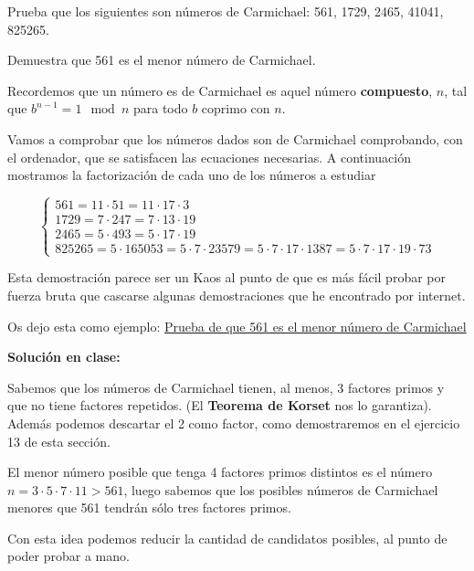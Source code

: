 

\begin{problem}[11]
\ppart Prueba que los siguientes son números de Carmichael: 561,
1729, 2465, 41041, 825265.

\ppart Demuestra que 561 es el menor número de Carmichael.

\solution


\spart
Recordemos que un número es de Carmichael es aquel número \textbf{compuesto}, $n$, tal que $b^{n-1}=1 \mod n$ para todo $b$ coprimo con $n$.

Vamos a comprobar que los números dados son de Carmichael comprobando, con el ordenador, que se satisfacen las ecuaciones necesarias. A continuación mostramos la factorización de cada uno de los números a estudiar

\[ \left\{\begin{array}{l}
561 = 11 \cdot 51 = 11 \cdot 17 \cdot 3\\
1729 = 7 \cdot 247 = 7 \cdot 13 \cdot 19\\
2465 = 5 \cdot 493 = 5 \cdot 17 \cdot 19\\
825265 = 5 \cdot 165053 = 5 \cdot 7 \cdot 23579 = 5 \cdot 7 \cdot 17 \cdot 1387 = 5 \cdot 7 \cdot 17 \cdot 19 \cdot 73
\end{array}\right.\]

\spart

Esta demostración parece ser un Kaos al punto de que es más fácil probar por fuerza bruta que cascarse algunas demostraciones que he encontrado por internet.

Os dejo esta como ejemplo: \href{http://math.stackexchange.com/questions/433029/the-smallest-example-of-a-carmichael-number}{Prueba de que 561 es el menor número de Carmichael}

\textbf{Solución en clase:}

Sabemos que los números de Carmichael tienen, al menos, 3 factores primos y que no tiene factores repetidos. (El \textbf{Teorema de Korset} nos lo garantiza). Además podemos descartar el 2 como factor, como demostraremos en el ejercicio 13 de esta sección.

El menor número posible que tenga 4 factores primos distintos es el número $n=3\cdot 5 \cdot 7 \cdot 11 > 561$, luego sabemos que los posibles números de Carmichael menores que 561 tendrán sólo tres factores primos.

Con esta idea podemos reducir la cantidad de candidatos posibles, al punto de poder probar a mano.

\end{problem}

